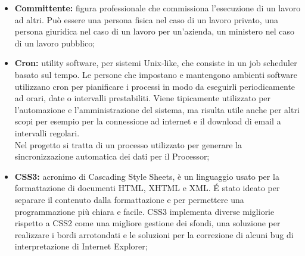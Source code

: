 \begin{itemize}
		\item \textbf{Committente:} figura professionale che commissiona l'esecuzione di un lavoro ad altri. Può essere una persona fisica nel caso di un lavoro privato, una persona giuridica nel caso di un lavoro per un'azienda, un ministero nel caso di un lavoro pubblico;
		\item \textbf{Cron:} utility software, per sistemi Unix-like, che consiste in un job scheduler basato sul tempo. Le persone che impostano e mantengono ambienti software utilizzano cron per pianificare i processi in modo da eseguirli periodicamente ad orari, date o intervalli prestabiliti. Viene tipicamente utilizzato per l'automazione e l'amministrazione del sistema, ma risulta utile anche per altri scopi per esempio per la connessione ad internet e il download di email a intervalli regolari.\\ 
		Nel progetto si tratta di un processo utilizzato per generare la sincronizzazione automatica dei dati per il Processor;
		\item \textbf{CSS3:} acronimo di Cascading Style Sheets, è un linguaggio usato per la formattazione di documenti HTML, XHTML e XML. É stato ideato per separare il contenuto dalla formattazione e per permettere una programmazione più chiara e facile. CSS3 implementa diverse migliorie rispetto a CSS2 come una migliore gestione dei sfondi, una soluzione per realizzare i bordi arrotondati e le soluzioni per la correzione di alcuni bug di interpretazione di Internet Explorer;
	\end{itemize}
\pagebreak

